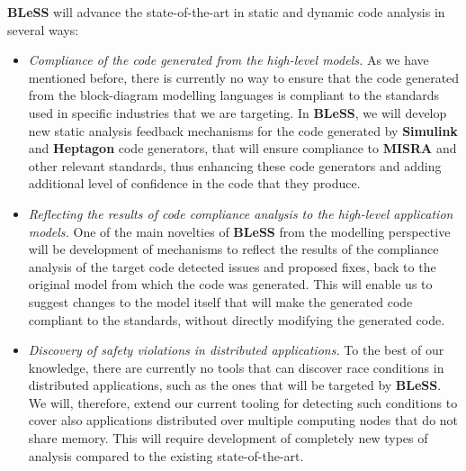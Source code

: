 \documentclass[a4paper,11pt]{article}
\newcommand{\project}[1]{\textbf{#1}\xspace}
\newcommand{\BLESS}{\project{BLeSS}}
\newcommand{\TheProject}{\BLESS}
\begin{document}
\TheProject will advance the state-of-the-art in static and dynamic 
code analysis in several ways:
\begin{itemize}
\item \emph{Compliance of the code generated from the high-level models.}
As we have mentioned before, there is currently no way to ensure that
the code generated from the block-diagram modelling languages 
is compliant to the standards
used in specific industries that we are targeting. In \TheProject, we will
develop new static analysis feedback mechanisms for the code generated by \textbf{Simulink}
and \textbf{Heptagon} code generators, that will ensure compliance to \textbf{MISRA} and other
relevant standards, thus enhancing these code generators and adding 
additional level of confidence in the code that they produce.

\item \emph{Reflecting the results of code compliance analysis to the
high-level application models.} One of the main novelties of \TheProject
from the modelling perspective will be development of mechanisms to 
reflect the results of the compliance analysis of the target code
detected issues and proposed fixes, back to the original model from which
the code was generated. This will enable us to suggest changes to the
model itself that will make the generated code compliant to the standards,
without directly modifying the generated code.%


\item \emph{Discovery of safety violations in distributed applications.} To the best of our knowledge, there are currently no tools that can discover race conditions in distributed applications, such as the ones that will be targeted by \TheProject{}. We will, therefore, extend our current tooling for detecting such conditions to cover also applications distributed over multiple computing nodes that do not share memory. This will require development of completely new types of analysis compared to the existing state-of-the-art.


\end{itemize}
\end{document}
